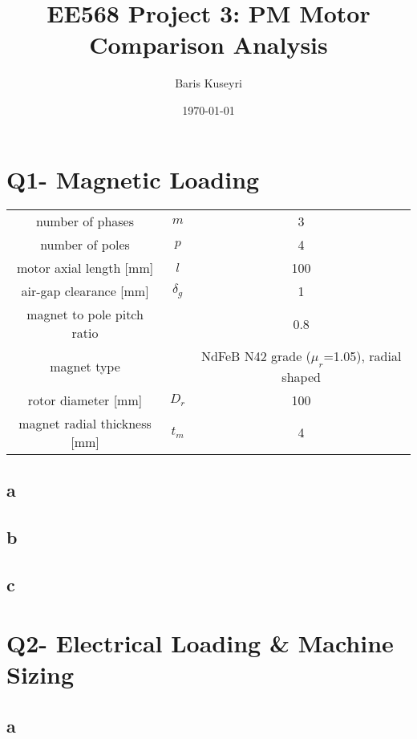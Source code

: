\documentclass[a4paper, 11pt, titlepage]{article}
\begin{document}
\title{EE568 Project 3: PM Motor Comparison Analysis}
\author{Baris Kuseyri}
\date{\today}
\maketitle

\tableofcontents


\section{Q1- Magnetic Loading}

\begin{tabular}{|c|c|c|}
	number of phases & $m$ & 3 \\
	number of poles & $p$ & 4 \\
	motor axial length [mm] & $l$ & 100 \\ 
	air-gap clearance [mm] & $\delta_g$ & 1 \\
	magnet to pole pitch ratio & & 0.8 \\
	
	
	magnet type & & NdFeB N42 grade ($\mu_r$=1.05), radial shaped \\
	rotor diameter [mm] & $D_r$ & 100 \\
	magnet radial thickness [mm] & $t_m$ & 4 \\
	
\end{tabular}


\subsection{a}

\subsection{b}

\subsection{c}


\section{Q2- Electrical Loading \& Machine Sizing}


\subsection{a}
\end{document}
